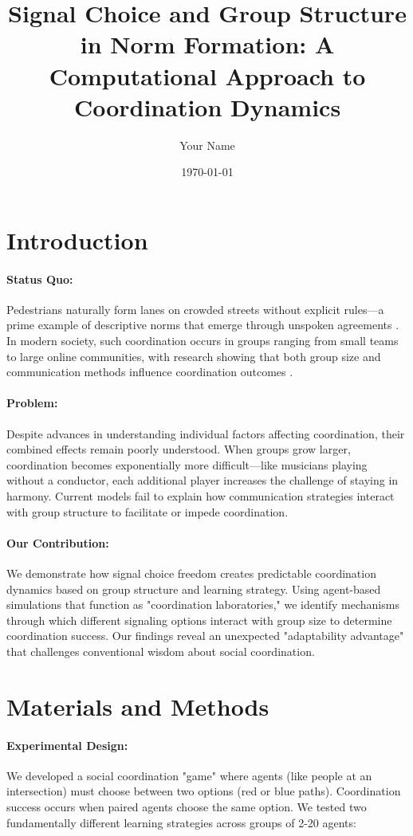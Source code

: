 \documentclass[12pt,a4paper]{article}
\title{Signal Choice and Group Structure in Norm Formation: A Computational Approach to Coordination Dynamics}
\author{Your Name}
\date{\today}
\begin{document}
\maketitle

\section{Introduction}
\paragraph{Status Quo:} Pedestrians naturally form lanes on crowded streets without explicit rules—a prime example of descriptive norms that emerge through unspoken agreements \citep{Baronchelli2018}. In modern society, such coordination occurs in groups ranging from small teams to large online communities, with research showing that both group size and communication methods influence coordination outcomes \citep{Balliet2010, Centola2015}.

\paragraph{Problem:} Despite advances in understanding individual factors affecting coordination, their combined effects remain poorly understood. When groups grow larger, coordination becomes exponentially more difficult—like musicians playing without a conductor, each additional player increases the challenge of staying in harmony. Current models fail to explain how communication strategies interact with group structure to facilitate or impede coordination.

\paragraph{Our Contribution:} We demonstrate how signal choice freedom creates predictable coordination dynamics based on group structure and learning strategy. Using agent-based simulations that function as "coordination laboratories," we identify mechanisms through which different signaling options interact with group size to determine coordination success. Our findings reveal an unexpected "adaptability advantage" that challenges conventional wisdom about social coordination.

\section{Materials and Methods}
\paragraph{Experimental Design:} We developed a social coordination "game" where agents (like people at an intersection) must choose between two options (red or blue paths). Coordination success occurs when paired agents choose the same option. We tested two fundamentally different learning strategies across groups of 2-20 agents:
\end{document}
